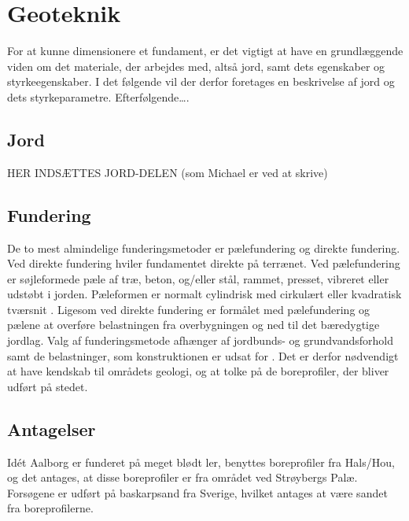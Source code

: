 \chapter{Geoteknik}

For at kunne dimensionere et fundament, er det vigtigt at have en grundlæggende viden om det materiale, der arbejdes med, altså jord, samt dets egenskaber og styrkeegenskaber. I det følgende vil der derfor foretages en beskrivelse af jord og dets styrkeparametre.
\newline \indent{     }  Efterfølgende….

\section{Jord}

HER INDSÆTTES JORD-DELEN (som Michael er ved at skrive)

\section{Fundering}
De to mest almindelige funderingsmetoder er pælefundering og direkte fundering.
\newline \indent{     }  Ved direkte fundering hviler fundamentet direkte på terrænet. 
\newline \indent{     }  Ved pælefundering er søjleformede pæle af træ, beton, og/eller stål, rammet, presset, vibreret eller udstøbt i jorden. Pæleformen er normalt cylindrisk med cirkulært eller kvadratisk tværsnit \citep[ s. 355]{geoteknik}.
Ligesom ved direkte fundering er formålet med pælefundering og pælene at overføre belastningen fra overbygningen og ned til det bæredygtige jordlag. 
\newline
\newline
Valg af funderingsmetode afhænger af jordbunds- og grundvandsforhold samt de belastninger, som konstruktionen er udsat for \citep[ s. 355]{geoteknik}. Det er derfor nødvendigt at have kendskab til områdets geologi, og at tolke på de boreprofiler, der bliver udført på stedet. 

\section{Antagelser}
Idét Aalborg er funderet på meget blødt ler, benyttes boreprofiler fra Hals/Hou, og det antages, at disse boreprofiler er fra området ved Strøybergs Palæ. 
\newline \indent{     }  Forsøgene er udført på baskarpsand fra Sverige, hvilket antages at være sandet fra boreprofilerne.

